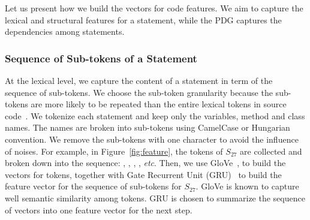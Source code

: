 Let us present how we build the vectors for code
features. We aim to capture the lexical and structural features for a
statement, while the PDG captures the dependencies among statements.











\vspace{-1pt}
\subsubsection{Sequence of Sub-tokens of a Statement}

At the lexical level, we capture the content of a statement in term of
the sequence of sub-tokens. We choose the sub-token granularity
because the sub-tokens are more likely to be repeated than the entire
lexical tokens in source code~\cite{icse20-methodname}.
%
We tokenize each statement and keep only the variables, method and
class names. The names are broken into sub-tokens using CamelCase or
Hungarian convention. We remove the sub-tokens with one character to
avoid the influence of noises. For example, in
Figure~\ref{fig:feature}, the tokens of $S_{27}$ are collected and
broken down into the sequence: , , ,
, {\em etc}. Then, we use GloVe~\cite{glove2014}, to build the
vectors for tokens, together with Gate Recurrent Unit
(GRU)~\cite{chung2014empirical} to build the feature vector for the
sequence of sub-tokens for $S_{27}$.
%
GloVe is known to capture well semantic similarity among tokens. GRU
is chosen to summarize the sequence of vectors into one feature vector
for the next step.

